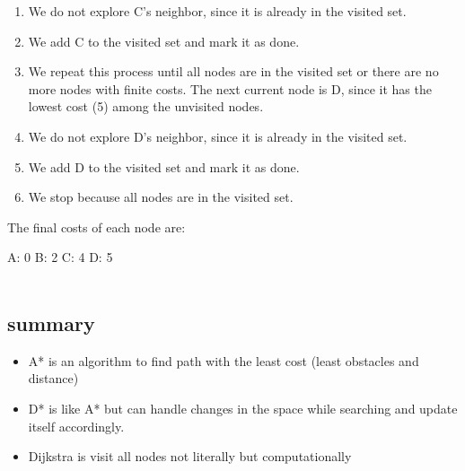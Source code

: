 \documentclass{article}
\begin{document}
\begin{enumerate}
\item We do not explore C’s neighbor, since it is already in the visited set.

\item We add C to the visited set and mark it as done.

\item We repeat this process until all nodes are in the visited set or there are no more nodes with finite costs. The next current node is D, since it has the lowest cost (5) among the unvisited nodes.

\item We do not explore D’s neighbor, since it is already in the visited set.

\item We add D to the visited set and mark it as done.

\item We stop because all nodes are in the visited set.
\end{enumerate}
 The final costs of each node are:

 A: 0 B: 2 C: 4 D: 5 
\\
\\


\subsection {summary}
\begin{itemize}
\item A* is an algorithm to find path with the least cost (least obstacles and distance) 
\item D* is like A*  but can handle changes in the space while searching and update itself accordingly.
\item Dijkstra is visit all nodes not literally but computationally
\end{itemize}
\end{document}
